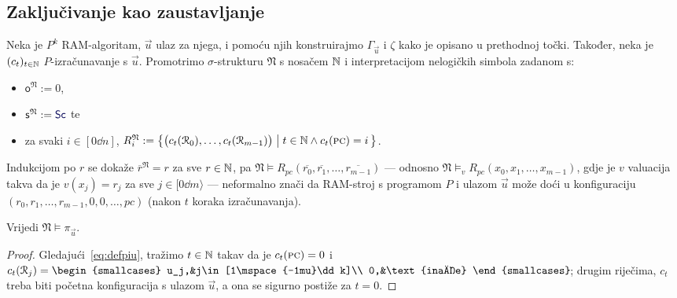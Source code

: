 \subsection{Zaključivanje kao zaustavljanje}

Neka je $P^k$ RAM-algoritam, $\vec u$ ulaz za njega, i pomoću njih konstruirajmo $\Gamma_{\vec u}$ i $\zeta$ kako je opisano u prethodnoj točki.
Također, neka je $(c_t)_{t\in{\mathbb N}}$ $P$-izračunavanje s $\vec u$. Promotrimo $\sigma$-strukturu $\mathfrak N$ s nosačem ${\mathbb N}$ i interpretacijom nelogičkih simbola zadanom s:
\begin{itemize}
	\item $\mathsf o^{\mathfrak N}:=0$,
	\item $\mathsf s^{\mathfrak N}:=\f{Sc}$ te
    \item za svaki $i\in[0\dd n]$,
    $
		R_i^{\mathfrak N}:=\bigl\{
        \bigl(c_t(\mathcal R_{0}),\dotsc,c_t(\mathcal R_{m-1})\bigr)
        \bigm|
        t\in{\mathbb N}\land c_t(\textsc{pc})=i
		\,\bigr\}
    $.
\end{itemize}
	Indukcijom po $r$ se dokaže $\overline r^{\mathfrak N}=r$ za sve $r\in{\mathbb N}$, pa $\mathfrak N\models R_{pc}(\overline{r_0},\overline{r_1},\dotsc,\overline{r_{m-1}})$ --- odnosno $\mathfrak N\models_v R_{pc}(x_0,x_1,\dotsc,x_{m-1})$, gdje je $v$ valuacija takva da je $v(x_j)=r_j$ za sve $j\in[0\dd m\rangle$ --- neformalno znači da RAM-stroj s programom $P$ i ulazom $\vec u$ može doći u konfiguraciju $(r_0,r_1,\dotsc,r_{m-1},0,0,\dotsc,pc)$ (nakon $t$ koraka izračunavanja).

\begin{lema}[{name=[istinitost početne formule u $\mathfrak N$]}]\label{lm:Npiu}
Vrijedi $\mathfrak N\models\pi_{\vec u}$.
\end{lema}
\begin{proof}
Gledajući~\eqref{eq:defpiu}, tražimo $t\in{\mathbb N}$ takav da je $c_t(\textsc{pc})=0$ i $c_t(\reg j)=\begin{smallcases}
	u_j,&j\in[1\mspace{-1mu}\dd k]\\
0,&\text{inače}
\end{smallcases}\!$; drugim riječima, $c_t$ treba biti početna konfiguracija s ulazom $\vec u$, a ona se sigurno postiže za $t=0$. %
\end{proof}

